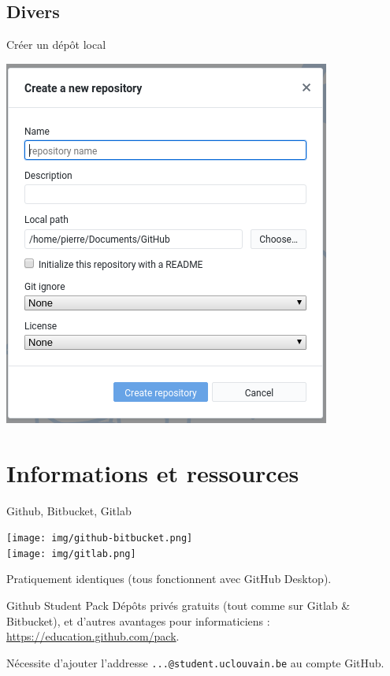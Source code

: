 \documentclass{beamer}
\begin{document}
\subsection{Divers}


\begin{frame}{Créer un dépôt local}
    \begin{center}
    	\includegraphics[scale=0.45]{img/new_repo.png}
    \end{center}
\end{frame}

\section{Informations et ressources}

\begin{frame}{Github, Bitbucket, Gitlab}
    \begin{center}
        \texttt{[image: img/github-bitbucket.png]} \\
        \texttt{[image: img/gitlab.png]}
    \end{center}
    Pratiquement identiques (tous fonctionnent avec GitHub Desktop).
\end{frame}

\begin{frame}{Github Student Pack}
    Dépôts privés gratuits (tout comme sur Gitlab \& Bitbucket), et d'autres avantages pour informaticiens : \url{https://education.github.com/pack}.

    Nécessite d'ajouter l'addresse \texttt{...@student.uclouvain.be} au compte
    GitHub.
\end{frame}
\end{document}
